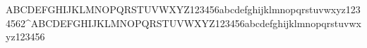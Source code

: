 {A}{B}{C}{D}{E}{F}{G}{H}{I}{J}{K}{L}{M}{N}{O}{P}{Q}{R}{S}{T}{U}{V}{W}{X}{Y}{Z}123456{a}{b}{c}{d}{e}{f}{g}{h}{i}{j}{k}{l}{m}{n}{o}{p}{q}{r}{s}{t}{u}{v}{w}{x}{y}{z}123456{2}^{{A}{B}{C}{D}{E}{F}{G}{H}{I}{J}{K}{L}{M}{N}{O}{P}{Q}{R}{S}{T}{U}{V}{W}{X}{Y}{Z}123456{a}{b}{c}{d}{e}{f}{g}{h}{i}{j}{k}{l}{m}{n}{o}{p}{q}{r}{s}{t}{u}{v}{w}{x}{y}{z}123456}